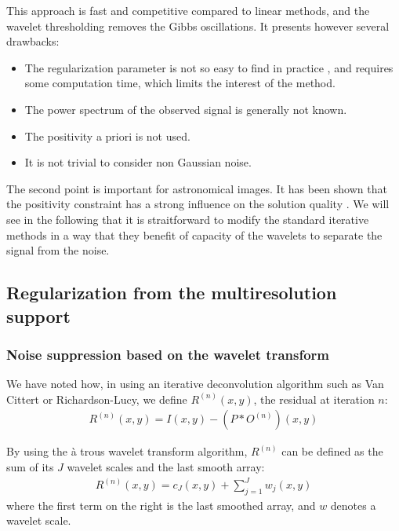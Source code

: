 \documentclass[11pt,a4paper]{article}
\begin{document}
This approach is fast and competitive compared to linear methods, and
the wavelet thresholding removes the Gibbs oscillations. It presents however
several drawbacks:
\begin{itemize}
\item The regularization parameter is not so easy to find in practice
\cite{rest:neelamani01}, and requires some computation time, which limits
the interest of the method.
\item The power spectrum of the observed signal is generally not known. 
\item The positivity a priori is not used. 
\item It is not trivial to consider non Gaussian noise.
\end{itemize}
The second point is important for astronomical images. It has been shown
that the positivity constraint has a strong influence on the solution quality
\cite{rest:kempen00}. 
We will see in the following that it is straitforward
to modify the standard iterative methods in a way that they benefit of
capacity of the wavelets to separate the signal from the noise.

\subsection{Regularization from the multiresolution support}

\subsubsection{Noise suppression based on the wavelet transform}
We have noted how, in using 
an iterative deconvolution algorithm such as  Van Cittert or
Richardson-Lucy, we define $R^{(n)}(x,y)$, the residual at iteration $n$:
\begin{eqnarray}
R^{(n)}(x,y) = I(x,y) - (P * O^{(n)})(x,y)
\end{eqnarray}
 
 By using the \`a trous wavelet transform algorithm, $R^{(n)}$ 
can be defined as the sum of its $J$ wavelet scales and the last smooth 
array:
\begin{eqnarray}
R^{(n)}(x,y) = c_{J}(x,y) + \sum_{j=1}^{J} w_j(x,y) 
\label{resid}
\end{eqnarray}
where the first term on the right is the last smoothed array, 
and $w$ denotes a wavelet scale.
 
\end{document}
